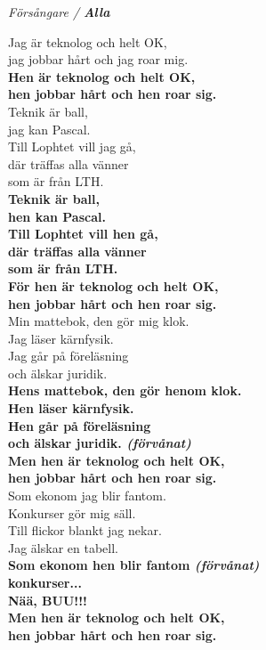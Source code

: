 \documentclass[a6paper,10pt,twoside]{article}
\begin{document}
\noindent
\begin{center}
\textit{Försångare / \textbf{Alla}}
\end{center}
\begin{lyrics}
Jag är teknolog och helt OK,\\
jag jobbar hårt och jag roar mig.\\
\textbf{Hen är teknolog och helt OK,\\
hen jobbar hårt och hen roar sig.}
\vspace{5pt}\\
Teknik är ball,\\
jag kan Pascal.\\
Till Lophtet vill jag gå,\\
där träffas alla vänner\\
som är från LTH.
\vspace{5pt}\\
\textbf{Teknik är ball,\\
hen kan Pascal.\\
Till Lophtet vill hen gå,\\
där träffas alla vänner\\
som är från LTH.
\vspace{5pt}\\
För hen är teknolog och helt OK,\\
hen jobbar hårt och hen roar sig.}
\vspace{5pt}\\
Min mattebok, den gör mig klok.\\
Jag läser kärnfysik.\\
Jag går på föreläsning\\
och älskar juridik.
\vspace{5pt}\\
\textbf{Hens mattebok, den gör henom klok.\\
Hen läser kärnfysik.\\
Hen går på föreläsning\\
och älskar juridik. \textit{(förvånat)}
\vspace{5pt}\\
Men hen är teknolog och helt OK,\\
hen jobbar hårt och hen roar sig.}
\vspace{5pt}\\

\newpage
\noindent
Som ekonom jag blir fantom.\\
Konkurser gör mig säll.\\
Till flickor blankt jag nekar.\\
Jag älskar en tabell.
\vspace{5pt}\\
\textbf{Som ekonom hen blir fantom \textit{(förvånat)}\\
konkurser...\\
Nää, BUU!!!
\vspace{5pt}\\
Men hen är teknolog och helt OK,\\
hen jobbar hårt och hen roar sig.}
\end{lyrics}
\end{document}
